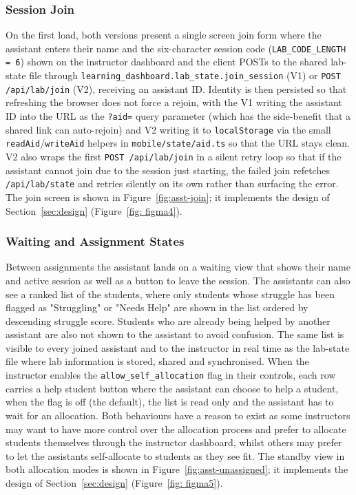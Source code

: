 \subsubsection{Session Join}

On the first load, both versions present a single screen join form where the assistant enters their name and the six-character session code (\texttt{LAB\_CODE\_LENGTH = 6}) shown on the instructor dashboard and the client POSTs to the shared lab-state file through \texttt{learning\_dashboard.lab\_state.join\_session} (V1) or \texttt{POST /api/lab/join} (V2), receiving an assistant ID. 
Identity is then persisted so that refreshing the browser does not force a rejoin, with the V1 writing the assistant ID into the URL as the \texttt{?aid=} query parameter (which has the side-benefit that a shared link can auto-rejoin) and V2 writing it to \texttt{localStorage} via the small \texttt{readAid}/\texttt{writeAid} helpers in \texttt{mobile/state/aid.ts} so that the URL stays clean. 
V2 also wraps the first \texttt{POST /api/lab/join} in a silent retry loop so that if the assistant cannot join due to the session just starting, the failed join refetches \texttt{/api/lab/state} and retries silently on its own rather than surfacing the error. The join screen is shown in Figure~\ref{fig:asst-join}; it implements the design of Section~\ref{sec:design} (Figure~\ref{fig: figma4}).



\subsubsection{Waiting and Assignment States}

Between assignments the assistant lands on a waiting view that shows their name and active session as well as a button to leave the session. 
The assistants can also see a ranked list of the students, where only students whose struggle has been flagged as "Struggling" or "Needs Help" are shown in the list ordered by descending struggle score. 
Students who are already being helped by another assistant are also not shown to the assistant to avoid confusion. 
The same list is visible to every joined assistant and to the instructor in real time as the lab-state file where lab information is stored, shared and synchronised. 
When the instructor enables the \texttt{allow\_self\_allocation} flag in their controls, each row carries a help student button where the assistant can choose to help a student, when the flag is off (the default), the list is read only and the assistant has to wait for an allocation. 
Both behaviours have a reason to exist as some instructors may want to have more control over the allocation process and prefer to allocate students themselves through the instructor dashboard, whilst others may prefer to let the assistants self-allocate to students as they see fit. The standby view in both allocation modes is shown in Figure~\ref{fig:asst-unassigned}; it implements the design of Section~\ref{sec:design} (Figure~\ref{fig: figma5}).

